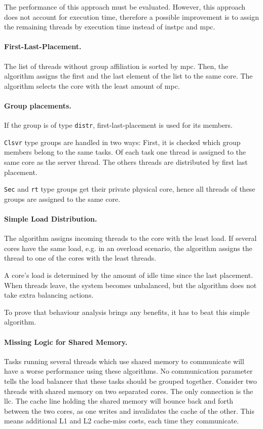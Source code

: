 The performance of this approach must be evaluated.
However, this approach does not account for execution time, therefore a
possible improvement is to assign the remaining threads by execution time
instead of \gls{instpc} and \gls{mpc}.


\paragraph{First-Last-Placement.}
The list of threads without group affiliation is sorted by \gls{mpc}.
Then, the algorithm assigns the first and the last element of the list to the
same core.
The algorithm selects the core with the least amount of \gls{mpc}.


\paragraph{Group placements.}
If the group is of type \texttt{distr}, first-last-placement is used for its
members.

\texttt{Clsvr} type groups are handled in two ways: First, it is checked which
group members belong to the same tasks.
Of each task one thread is assigned to the same core as the server thread.
The others threads are distributed by first last placement.

\texttt{Sec} and \texttt{rt} type groups get their private physical core, hence
all threads of these groups are assigned to the same core.


\paragraph{Simple Load Distribution.}
The algorithm assigns incoming threads to the core with the least load.
If several cores have the same load, e.g. in an overload scenario, the
algorithm assigns the thread to one of the cores with the least threads.

A core's load is determined by the amount of idle time since the last
placement.
When threads leave, the system becomes unbalanced, but the algorithm does not
take extra balancing actions.

To prove that behaviour analysis brings any benefits, it has to beat
this simple algorithm.


\paragraph{Missing Logic for Shared Memory.}
Tasks running several threads which use shared memory to communicate will have
a worse performance using these algorithms.
No communication parameter tells the load balancer that these tasks should be
grouped together.
Consider two threads with shared memory on two separated cores.
The only connection is the \gls{llc}.
The cache line holding the shared memory will bounce back and forth between
the two cores, as one writes and invalidates the cache of the other.
This means additional L1 and L2 cache-miss costs, each time they communicate.

